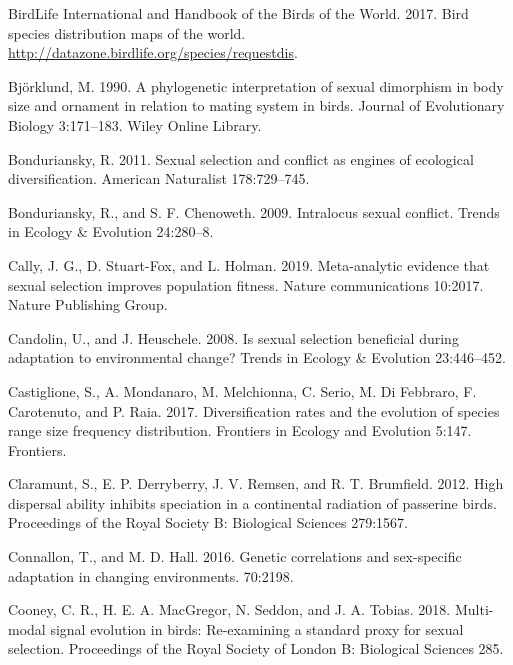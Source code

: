 \documentclass[]{article}
\begin{document}
\leavevmode\hypertarget{ref-birdlife_2017}{}%
BirdLife International and Handbook of the Birds of the World. 2017.
Bird species distribution maps of the world.
\url{http://datazone.birdlife.org/species/requestdis}.

\leavevmode\hypertarget{ref-bjorklund_1990}{}%
Björklund, M. 1990. A phylogenetic interpretation of sexual dimorphism
in body size and ornament in relation to mating system in birds. Journal
of Evolutionary Biology 3:171--183. Wiley Online Library.

\leavevmode\hypertarget{ref-Bonduriansky_2011}{}%
Bonduriansky, R. 2011. Sexual selection and conflict as engines of
ecological diversification. American Naturalist 178:729--745.

\leavevmode\hypertarget{ref-Bonduriansky_Chenoweth_2009}{}%
Bonduriansky, R., and S. F. Chenoweth. 2009. Intralocus sexual conflict.
Trends in Ecology \& Evolution 24:280--8.

\leavevmode\hypertarget{ref-Cally_2019}{}%
Cally, J. G., D. Stuart-Fox, and L. Holman. 2019. Meta-analytic evidence
that sexual selection improves population fitness. Nature communications
10:2017. Nature Publishing Group.

\leavevmode\hypertarget{ref-Candolin_2008}{}%
Candolin, U., and J. Heuschele. 2008. Is sexual selection beneficial
during adaptation to environmental change? Trends in Ecology \&
Evolution 23:446--452.

\leavevmode\hypertarget{ref-Castiglione_2017}{}%
Castiglione, S., A. Mondanaro, M. Melchionna, C. Serio, M. Di Febbraro,
F. Carotenuto, and P. Raia. 2017. Diversification rates and the
evolution of species range size frequency distribution. Frontiers in
Ecology and Evolution 5:147. Frontiers.

\leavevmode\hypertarget{ref-Claramunt_2012}{}%
Claramunt, S., E. P. Derryberry, J. V. Remsen, and R. T. Brumfield.
2012. High dispersal ability inhibits speciation in a continental
radiation of passerine birds. Proceedings of the Royal Society B:
Biological Sciences 279:1567.

\leavevmode\hypertarget{ref-Connallon_Hall_2016}{}%
Connallon, T., and M. D. Hall. 2016. Genetic correlations and
sex-specific adaptation in changing environments. 70:2198.

\leavevmode\hypertarget{ref-Cooney_2018}{}%
Cooney, C. R., H. E. A. MacGregor, N. Seddon, and J. A. Tobias. 2018.
Multi-modal signal evolution in birds: Re-examining a standard proxy for
sexual selection. Proceedings of the Royal Society of London B:
Biological Sciences 285.
\end{document}

